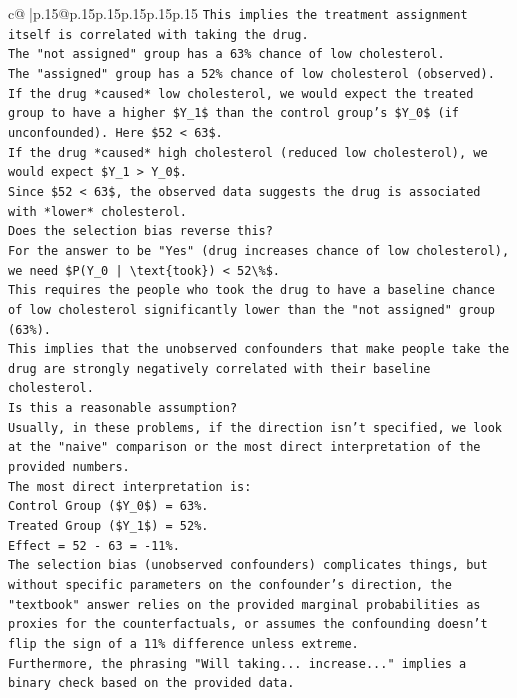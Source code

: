 \documentclass{article}
\begin{document}
{\begin{supertabular}{c@{$\;$}|p{.15\linewidth}@{}p{.15\linewidth}p{.15\linewidth}p{.15\linewidth}p{.15\linewidth}p{.15\linewidth}}
{{{\texttt{This implies the treatment assignment itself is correlated with taking the drug.} \\
\texttt{The "not assigned" group has a 63\% chance of low cholesterol.} \\
\texttt{The "assigned" group has a 52\% chance of low cholesterol (observed).} \\
\texttt{If the drug *caused* low cholesterol, we would expect the treated group to have a higher \$Y\_1\$ than the control group's \$Y\_0\$ (if unconfounded). Here \$52 < 63\$.} \\
\texttt{If the drug *caused* high cholesterol (reduced low cholesterol), we would expect \$Y\_1 > Y\_0\$.} \\
\texttt{Since \$52 < 63\$, the observed data suggests the drug is associated with *lower* cholesterol.} \\
\texttt{Does the selection bias reverse this?} \\
\texttt{For the answer to be "Yes" (drug increases chance of low cholesterol), we need \$P(Y\_0 | \textbackslash{}text\{took\}) < 52\textbackslash{}\%\$.} \\
\texttt{This requires the people who took the drug to have a baseline chance of low cholesterol significantly lower than the "not assigned" group (63\%).} \\
\texttt{This implies that the unobserved confounders that make people take the drug are strongly negatively correlated with their baseline cholesterol.} \\
\texttt{Is this a reasonable assumption?} \\
\texttt{Usually, in these problems, if the direction isn't specified, we look at the "naive" comparison or the most direct interpretation of the provided numbers.} \\
\texttt{The most direct interpretation is:} \\
\texttt{Control Group (\$Y\_0\$) = 63\%.} \\
\texttt{Treated Group (\$Y\_1\$) = 52\%.} \\
\texttt{Effect = 52 {-} 63 = {-}11\%.} \\
\texttt{The selection bias (unobserved confounders) complicates things, but without specific parameters on the confounder's direction, the "textbook" answer relies on the provided marginal probabilities as proxies for the counterfactuals, or assumes the confounding doesn't flip the sign of a 11\% difference unless extreme.} \\
\texttt{Furthermore, the phrasing "Will taking... increase..." implies a binary check based on the provided data.} \\
}}}
\end{supertabular}}
\end{document}
